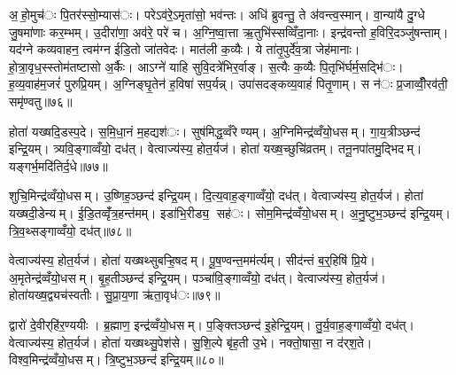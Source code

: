 अ॒हो॒मुच॑ः पि॒तर॑स्सो॒म्यास॑ः। परेऽव॑रे॒ऽमृता॑सो॒ भव॑न्तः। अधि॑ ब्रुवन्तु॒ ते अ॑वन्त्व॒स्मान्। वा॒न्या॑यै दु॒ग्धे जु॒षमा॑णाः कर॒म्भम्। उ॒दीरा॑णा॒ अव॑रे॒ परे॑ च। अ॒ग्नि॒ष्वा॒त्ता ऋ॒तुभि॑स्सव्विँदा॒नाः। इन्द्र॑वन्तो ह॒विरि॒दञ्जु॑षन्ताम्। यद॑ग्ने कव्यवाहन॒ त्वम॑ग्न ईडि॒तो जा॑तवेदः। मात॑ली क॒व्यैः। ये ता॑तृ॒पुर्दे॑व॒त्रा जेह॑मानाः। हो॒त्रा॒वृध॒स्स्तोम॑तष्टासो अ॒र्कैः। आऽग्ने॑ याहि सुवि॒दत्रे॑भिर॒र्वाङ्। स॒त्यैः क॒व्यैः पि॒तृभि॑र्घर्म॒सद्भि॑ः। ह॒व्य॒वाह॑म॒जरं॑ पुरुप्रि॒यम्। अ॒ग्निङ्घृ॒तेन॑ ह॒विषा॑ सप॒र्यन्न्। उपा॑सदङ्कव्य॒वाहं॑ पितृ॒णाम्। स न॑ः प्र॒जाव्वीँ॒रव॑ती॒ समृ॑ण्वतु॥७६॥


होता॑ यख्षदि॒डस्प॒दे। स॒मि॒धा॒नं म॒हद्यश॑ः। सुष॑मिद्ध॒व्वँरेण्यम्। अ॒ग्निमिन्द्र॑व्वँयो॒धसम्। गा॒य॒त्रीञ्छन्द॑ इन्द्रि॒यम्। त्र्यवि॒ङ्गाव्वँयो॒ दध॑त्। वेत्वाज्य॑स्य॒ होत॒र्यज॑। होता॑ यख्ष॒च्छुचि॑व्रतम्। तनू॒नपा॑तमु॒द्भिदम्। यङ्गर्भ॒मदि॑तिर्द॒धे॥७७॥

शुचि॒मिन्द्र॑व्वँयो॒धसम्। उ॒ष्णिह॒ञ्छन्द॑ इन्द्रि॒यम्। दि॒त्य॒वाह॒ङ्गाव्वँयो॒ दध॑त्। वेत्वाज्य॑स्य॒ होत॒र्यज॑। होता॑ यख्षदी॒डेन्यम्। ई॒डि॒तव्वृँ॑त्र॒हन्त॑मम्। इडा॑भि॒रीड्य॒ सह॑ः। सोम॒मिन्द्र॑व्वँयो॒धसम्। अ॒नु॒ष्टुभ॒ञ्छन्द॑ इन्द्रि॒यम्। त्रि॒व॒थ्सङ्गाव्वँयो॒ दध॑त्॥७८॥

वेत्वाज्य॑स्य॒ होत॒र्यज॑। होता॑ यख्षथ्सुबऱ्हि॒षदम्। पू॒ष॒ण्वन्त॒मम॑र्त्यम्। सीद॑न्तं ब॒र्॒हिषि॑ प्रि॒ये। अ॒मृतेन्द्र॑व्वँयो॒धसम्। बृ॒ह॒तीञ्छन्द॑ इन्द्रि॒यम्। पञ्चा॑वि॒ङ्गाव्वँयो॒ दध॑त्। वेत्वाज्य॑स्य॒ होत॒र्यज॑। होता॑यख्ष॒द्व्यच॑स्वतीः। सु॒प्रा॒य॒णा ऋ॑ता॒वृध॑ः॥७९॥

द्वारो॑ दे॒वीर्‌हि॑र॒ण्ययीः। ब्र॒ह्माण॒ इन्द्र॑व्वँयो॒धसम्। प॒ङ्क्तिञ्छन्द॑ इ॒हेन्द्रि॒यम्। तु॒र्य॒वाह॒ङ्गाव्वँयो॒ दध॑त्। वेत्वाज्य॑स्य॒ होत॒र्यज॑। होता॑ यख्षथ्सु॒पेश॑से। सु॒शि॒ल्पे बृ॑ह॒ती उ॒भे। नक्तो॒षासा॒ न द॑र्‌श॒ते। विश्व॒मिन्द्र॑व्वँयो॒धसम्। त्रि॒ष्टुभ॒ञ्छन्द॑ इन्द्रि॒यम्॥८०॥

